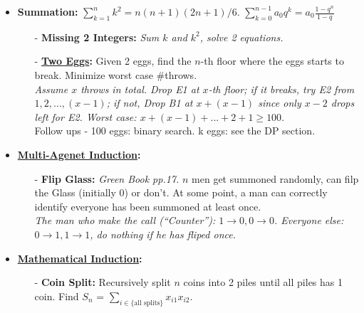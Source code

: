 \documentclass[9pt, landscape]{article}
\begin{document}
\begin{multicols*}{3}
\begin{itemize}
\begin{itemize}[leftmargin=10pt,noitemsep,topsep=0pt,partopsep=0pt]
		\textit{Each shook 1-25 hands (holes), and there are 26 ppl (pigeons). }
		\item[-] \textbf{Friend Circle:} there are 6 people at the party, either at least 3 are friends (with each other), or at least 3 are strangers.\\
		\textit{There are 1-6 friend circles. (3-6): 3 strangers by selecting 1 from each circ. (1-2): 6 pigeons in 1/2 holes, at least 3 friends.}.
	\end{itemize}
	\item \textbf{Summation:} $\sum_{k=1}^n k^2 = n(n+1)(2n+1)/6$. $\sum_{k=0}^{n-1} a_0 q^{k} = a_0\frac{1-q^n}{1-q}$
	\begin{itemize}[leftmargin=10pt,noitemsep,topsep=0pt,partopsep=0pt]
		\item[-] \textbf{Missing 2 Integers:} \textit{Sum $k$ and $k^2$, solve 2 equations.}
		\item[-] \textbf{\href{http://datagenetics.com/blog/july22012/index.html}{Two Eggs}:} Given 2 eggs, find the $n$-th floor where the eggs starts to break. Minimize worst case \#throws.\\
		\textit{Assume $x$ throws in total. Drop E1 at $x$-th floor; if it breaks, try E2 from $1,2,...,(x-1)$; if not, Drop B1 at $x+(x-1)$ since only $x-2$ drops left for E2. Worst case: $x+(x-1)+...+2+1\geq 100$}.\\
		Follow ups - 100 eggs: binary search. k eggs: see the DP section.
	\end{itemize}
	\item \textbf{\href{https://en.wikipedia.org/wiki/Induction_puzzles}{Multi-Agenet Induction}:}
	\begin{itemize}[leftmargin=10pt,noitemsep,topsep=0pt,partopsep=0pt]
	\item[-] \textbf{Flip Glass:} \textit{Green Book pp.17.} $n$ men get summoned randomly, can filp the Glass (initially $0$) or don't. At some point, a man can correctly identify everyone has been summoned at least once. \\
	\textit{The man who make the call (``Counter''): $1\to 0, 0\to 0$. Everyone else: $0\to 1, 1\to 1$, do nothing if he has fliped once.}
	\end{itemize}
	\item \textbf{\href{https://en.wikipedia.org/wiki/Mathematical_induction}{Mathematical Induction}:}
	\begin{itemize}[leftmargin=10pt,noitemsep,topsep=0pt,partopsep=0pt]
		\item[-] \textbf{Coin Split:} Recursively split $n$ coins into 2 piles until all piles has 1 coin. Find $S_n$ = $\sum_{i \in \{\text{all splits}\}} x_{i1} x_{i2}$. \\

\end{itemize}
\end{itemize}
\end{multicols*}
\end{document}
